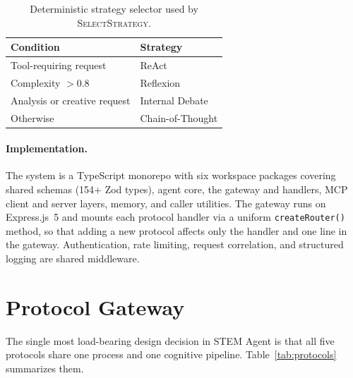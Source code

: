 \documentclass[11pt]{article}
\begin{document}
\begin{table}[t]
  \small
  \centering
  \begin{tabular}{ll}
    \toprule
    Condition & Strategy \\
    \midrule
    Tool-requiring request          & ReAct \\
    Complexity $> 0.8$              & Reflexion \\
    Analysis or creative request    & Internal Debate \\
    Otherwise                       & Chain-of-Thought \\
    \bottomrule
  \end{tabular}
  \caption{Deterministic strategy selector used by \textsc{SelectStrategy}.}
  \label{tab:strategy}
\end{table}

\paragraph{Implementation.}
The system is a TypeScript monorepo with six workspace packages covering shared schemas (154+ Zod types), agent core, the gateway and handlers, MCP client and server layers, memory, and caller utilities. The gateway runs on Express.js~5 and mounts each protocol handler via a uniform \texttt{createRouter()} method, so that adding a new protocol affects only the handler and one line in the gateway. Authentication, rate limiting, request correlation, and structured logging are shared middleware.

\section{Protocol Gateway}
\label{sec:protocols}

The single most load-bearing design decision in STEM Agent is that all five protocols share one process and one cognitive pipeline. Table~\ref{tab:protocols} summarizes them.
\end{document}
